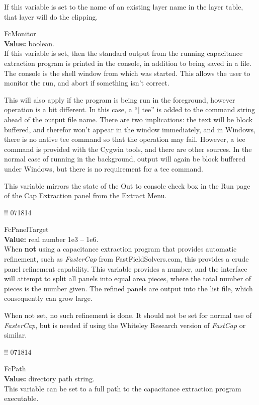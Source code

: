 \begin{description}
If this variable is set to the name of an existing layer name in the
layer table, that layer will do the clipping.

\item{\et FcMonitor}\\
{\bf Value:} boolean.\\
If this variable is set, then the standard output from the running
capacitance extraction program is printed in the console, in addition
to being saved in a file.  The console is the shell window from which
{\Xic} was started.  This allows the user to monitor the run, and
abort if something isn't correct.

This will also apply if the program is being run in the foreground,
however operation is a bit different.  In this case, a ``{\vt | tee}''
is added to the command string ahead of the output file name.  There
are two implications:  the text will be block buffered, and therefor
won't appear in the window immediately, and in Windows, there is no
native {\vt tee} command so that the operation may fail.  However, a
{\vt tee} command is provided with the Cygwin tools, and there are
other sources.  In the normal case of running in the background,
output will again be block buffered under Windows, but there is no
requirement for a {\vt tee} command.

This variable mirrors the state of the {\cb Out to console} check box
in the {\cb Run} page of the {\cb Cap Extraction} panel from the {\cb
Extract Menu}.

!! 071814
\item{\et FcPanelTarget}\\
{\bf Value:} real number 1e3 -- 1e6.\\
When {\bf not} using a capacitance extraction program that provides
automatic refinement, such as {\it FasterCap} from {\vt
FastFieldSolvers.com}, this provides a crude panel refinement
capability.  This variable provides a number, and the interface will
attempt to split all panels into equal area pieces, where the total
number of pieces is the number given.  The refined panels are output
into the list file, which consequently can grow large.

When not set, no such refinement is done.  It should not be set for
normal use of {\it FasterCap}, but is needed if using the Whiteley
Research version of {\it FastCap} or similar.

!! 071814
\item{\et FcPath}\\
{\bf Value:} directory path string.\\
This variable can be set to a full path to the capacitance extraction
program executable.


\end{description}
